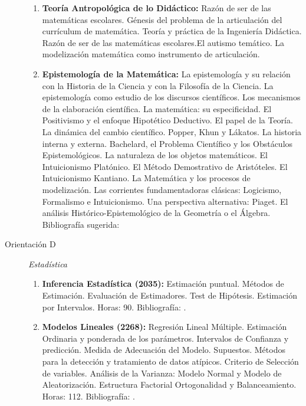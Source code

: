 \documentclass[a4paper, 12pt]{article}
\begin{document}
\begin{description}
\begin{enumerate}
\item\textbf{Teoría Antropológica de lo Didáctico:} Razón de ser  de las
matemáti\-cas escolares. Génesis del problema de la articulación
del currículum de matemática. Teoría y práctica de la Ingeniería
Didáctica. Razón de ser  de las matemáticas escolares.El autismo
temático. La modelización matemática como instrumento de
articulación. 
\item\textbf{Epistemología de la Matemática:}
La epistemología y su relación con la Historia de la Ciencia  y
con la Filosofía de la Ciencia. La epistemología como estudio de
los discursos científicos. Los mecanismos de la elaboración
científica. La matemática: su especificidad. El Positivismo y el
enfoque Hipotético Deductivo. El papel de la Teoría. La dinámica
del cambio científico. Popper, Khun y Lákatos. La historia interna
y externa. Bachelard, el Problema Científico y los Obstáculos
Epistemológicos. La naturaleza de los objetos matemáticos. El
Intuicionismo Platónico. El Método Demostrativo de Aristóteles. El
Intuicionismo Kantiano. La Matemática y los procesos de
mo\-delización. Las corrientes fundamentadoras clásicas:
Logicismo, Formalismo e Intuicionismo. Una perspectiva
alternativa: Piaget. El análisis Histórico-Epistemológico de la
Geometría o el Álgebra. Bibliografía sugerida: \cite{johshua,
klimo1,klimo2}




\end{enumerate}





\item[Orientación D]\emph{Estadística}
\begin{enumerate}



\item\textbf{ Inferencia Estadística (2035):} Estimación puntual. Métodos de Estimación.
Evaluación de Estimadores. Test de Hipótesis. Estimación por
Intervalos. Horas: 90. Bibliografía: \cite{steven,bickel,casella,  rohatgi}.


\item\textbf{ Modelos Lineales (2268):} Regresión Lineal Múltiple. Estimación
Ordinaria y ponderada de los parámetros. Intervalos de Confianza y
predicción. Medida de Adecuación del Modelo. Supuestos. Métodos
para la detección y tratamiento de datos atípicos. Criterio de
Selección de va\-riables. Análisis de la Varianza: Modelo Normal y
Modelo de Aleato\-rización. Estructura Factorial Ortogonalidad y
Balanceamiento. Horas: 112. Bibliografía: \cite{peck,rawlyngs,  searle}.


\end{enumerate}
\end{description}
\end{document}
